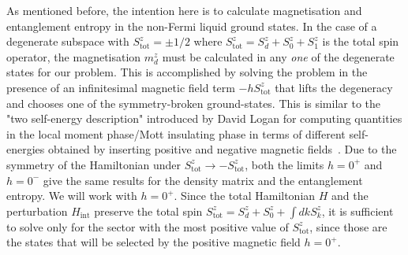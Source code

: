 \documentclass{iopart}
\begin{document}
As mentioned before, the intention here is to calculate magnetisation and entanglement entropy in the non-Fermi liquid ground states. In the case of a degenerate subspace with \(S_\text{tot}^z = \pm 1/2\) where \(S_\text{tot}^z = S_d^z + S_0^z + S_1^z\) is the total spin operator, the magnetisation \(m_d^z\) must be calculated in any {\it one} of the degenerate states for our problem. This is accomplished by solving the problem in the presence of an infinitesimal magnetic field term \(-h S_\text{tot}^z\) that lifts the degeneracy and chooses one of the symmetry-broken ground-states. This is similar to the "two self-energy description" introduced by David Logan for computing quantities in the local moment phase/Mott insulating phase in terms of different self-energies obtained by inserting positive and negative magnetic fields~\cite{Logan_2000,logan_2014,Logan_2015}. Due to the symmetry of the Hamiltonian under \(S_\text{tot}^z \to -S_\text{tot}^z\), both the limits \(h = 0^+\) and \(h=0^-\) give the same results for the density matrix and the entanglement entropy. We will work with \(h = 0^+\). Since the total Hamiltonian \(H\) and the perturbation \(H_\text{int}\) preserve the total spin \(S_\text{tot}^z = S_d^z + S_0^z + \int dk S_k^z\), it is sufficient to solve only for the sector with the most positive value of \(S_\text{tot}^z\), since those are the states that will be selected by the positive magnetic field \(h = 0^+\).
\end{document}
